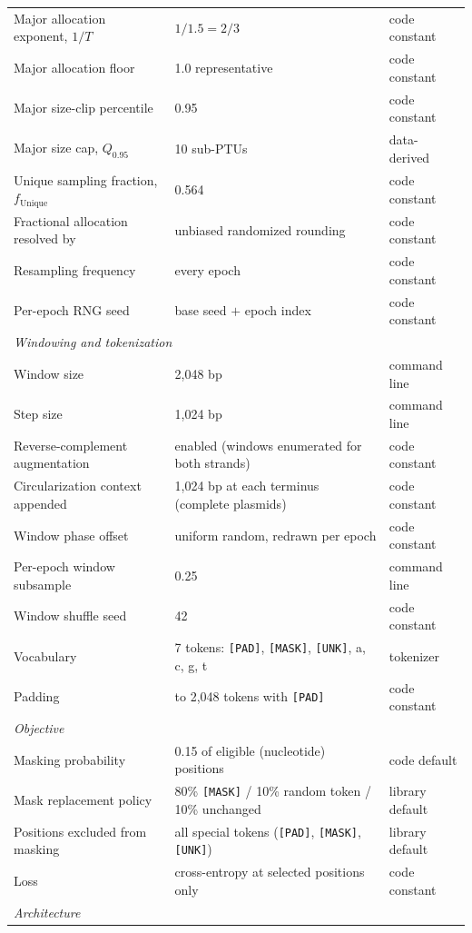 {\begin{longtable}{p{}p{}p{}}
Major allocation exponent, $1/T$ & $1/1.5 = 2/3$ & code constant \\
Major allocation floor & 1.0 representative & code constant \\
Major size-clip percentile & 0.95 & code constant \\
Major size cap, $Q_{0.95}$ & 10 sub-PTUs & data-derived \\
Unique sampling fraction, $f_{\mathrm{Unique}}$ & 0.564 & code constant \\
Fractional allocation resolved by & unbiased randomized rounding & code constant \\
Resampling frequency & every epoch & code constant \\
Per-epoch RNG seed & base seed $+$ epoch index & code constant \\
\midrule
\multicolumn{3}{l}{\textit{Windowing and tokenization}} \\
Window size & 2,048 bp & command line \\
Step size & 1,024 bp & command line \\
Reverse-complement augmentation & enabled (windows enumerated for both strands) & code constant \\
Circularization context appended & 1,024 bp at each terminus (complete plasmids) & code constant \\
Window phase offset & uniform random, redrawn per epoch & code constant \\
Per-epoch window subsample & 0.25 & command line \\
Window shuffle seed & 42 & code constant \\
Vocabulary & 7 tokens: \texttt{[PAD]}, \texttt{[MASK]}, \texttt{[UNK]}, a, c, g, t & tokenizer \\
Padding & to 2,048 tokens with \texttt{[PAD]} & code constant \\
\midrule
\multicolumn{3}{l}{\textit{Objective}} \\
Masking probability & 0.15 of eligible (nucleotide) positions & code default \\
Mask replacement policy & 80\% \texttt{[MASK]} / 10\% random token / 10\% unchanged & library default \\
Positions excluded from masking & all special tokens (\texttt{[PAD]}, \texttt{[MASK]}, \texttt{[UNK]}) & library default \\
Loss & cross-entropy at selected positions only & code constant \\
\midrule
\multicolumn{3}{l}{\textit{Architecture}} \\

\end{longtable}}
